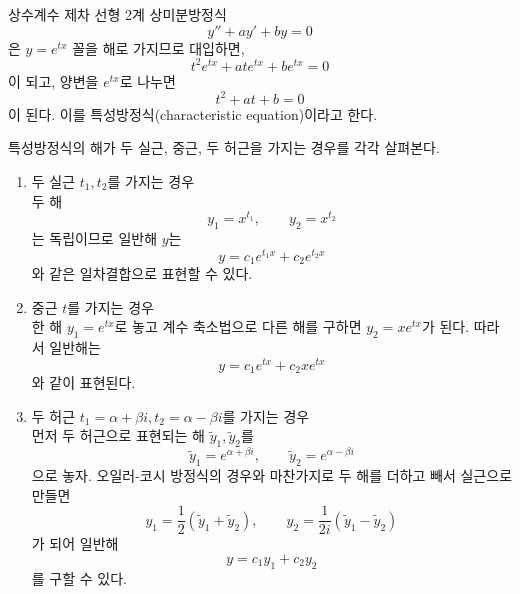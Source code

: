\documentclass[../engineering_mathematics_lecture_note.tex]{subfiles}
\begin{document}
\begin{example}
    상수계수 제차 선형 2계 상미분방정식
    \begin{equation*}
        y'' + ay' + by = 0
    \end{equation*}
    은 $y = e^{tx}$ 꼴을 해로 가지므로 대입하면,
    \begin{equation*}
        t^2 e^{tx} + at e^{tx} + b e^{tx} = 0
    \end{equation*}
    이 되고, 양변을 $e^{tx}$로 나누면
    \begin{equation*}
        t^2 + at + b = 0
    \end{equation*}
    이 된다.
    이를 특성방정식(characteristic equation)이라고 한다.

    특성방정식의 해가 두 실근, 중근, 두 허근을 가지는 경우를 각각 살펴본다.
    \begin{enumerate}
        \item 두 실근 $t_1, t_2$를 가지는 경우\\
            두 해
            \begin{equation*}
                y_1 = x^{t_1}, \qquad y_2 = x^{t_2}
            \end{equation*}
            는 독립이므로 일반해 $y$는
            \begin{equation*}
                y = c_1 e^{t_1 x} + c_2 e^{t_2 x}
            \end{equation*}
            와 같은 일차결합으로 표현할 수 있다.

        \item 중근 $t$를 가지는 경우\\
            한 해 $y_1 = e^{tx}$로 놓고 계수 축소법으로 다른 해를 구하면 $y_2 = x e^{tx}$가 된다.
            따라서 일반해는
            \begin{equation*}
                y = c_1 e^{tx} + c_2 x e^{tx}
            \end{equation*}
            와 같이 표현된다.

        \item 두 허근 $t_1 = \alpha + \beta i, t_2 = \alpha - \beta i$를 가지는 경우\\
            먼저 두 허근으로 표현되는 해 $\tilde y_1, \tilde y_2$를
            \begin{equation*}
                \tilde y_1 = e^{\alpha + \beta i}, \qquad \tilde y_2 = e^{\alpha - \beta i}
            \end{equation*}
            으로 놓자.
            오일러-코시 방정식의 경우와 마찬가지로 두 해를 더하고 빼서 실근으로 만들면
            \begin{equation*}
                y_1 = \frac12 (\tilde y_1 + \tilde y_2), \qquad y_2 = \frac{1}{2i} (\tilde y_1 - \tilde y_2)
            \end{equation*}
            가 되어 일반해
            \begin{equation*}
                y = c_1 y_1 + c_2 y_2
            \end{equation*}
            를 구할 수 있다.
    \end{enumerate}
\end{example}
\end{document}
